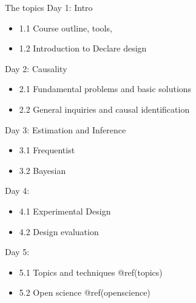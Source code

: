 \documentclass[
  11pt,
  ignorenonframetext,
]{beamer}
\providecommand{\tightlist}{%
  \setlength{\itemsep}{0pt}\setlength{\parskip}{0pt}}\usepackage{longtable,booktabs,array}
\begin{document}
\begin{frame}{The topics}
\protect\hypertarget{the-topics}{}
Day 1: Intro

\begin{itemize}
\tightlist
\item
  1.1 Course outline, tools,
\item
  1.2 Introduction to Declare design
\end{itemize}

Day 2: Causality

\begin{itemize}
\tightlist
\item
  2.1 Fundamental problems and basic solutions
\item
  2.2 General inquiries and causal identification
\end{itemize}

Day 3: Estimation and Inference

\begin{itemize}
\tightlist
\item
  3.1 Frequentist
\item
  3.2 Bayesian
\end{itemize}

Day 4:

\begin{itemize}
\tightlist
\item
  4.1 Experimental Design
\item
  4.2 Design evaluation
\end{itemize}

Day 5:

\begin{itemize}
\tightlist
\item
  5.1 Topics and techniques @ref(topics)
\item
  5.2 Open science @ref(openscience)
\end{itemize}
\end{frame}
\end{document}
